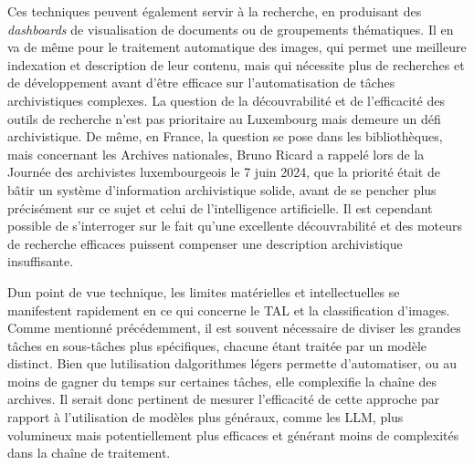 Ces
techniques peuvent également servir à la recherche, en produisant des
\emph{dashboards} de visualisation de documents ou de groupements
thématiques. Il en va de même pour le traitement automatique des images, qui
permet une meilleure indexation et description de leur contenu, mais qui
nécessite plus de recherches et de développement avant d'être efficace
sur l'automatisation de tâches archivistiques complexes. La question de
la découvrabilité et de l'efficacité des outils de recherche n'est pas
prioritaire au Luxembourg mais demeure un défi archivistique. De même, en
France, la question se pose dans les bibliothèques, mais concernant les
Archives nationales, Bruno Ricard a rappelé lors de la Journée des
archivistes luxembourgeois le 7 juin 2024, que la priorité était de bâtir
un système d'information archivistique solide, avant de se pencher plus
précisément sur ce sujet et celui de l'intelligence artificielle. Il est
cependant possible de s'interroger sur le fait qu'une excellente
découvrabilité et des moteurs de recherche efficaces puissent compenser
une description archivistique insuffisante.\newline

D\textquotesingle un point de vue technique, les limites matérielles et intellectuelles se manifestent rapidement en ce qui concerne le \gls{TAL} et la
classification d'images. Comme mentionné précédemment, il est souvent
nécessaire de diviser les grandes tâches en sous-tâches plus
spécifiques, chacune étant traitée par un modèle distinct. Bien que
l\textquotesingle utilisation d\textquotesingle algorithmes légers
permette d'automatiser, ou au moins de gagner du temps sur certaines
tâches, elle complexifie la \gls{chaîne} des archives. Il serait
donc pertinent de mesurer l'efficacité de cette approche par rapport à
l'utilisation de modèles plus généraux, comme les \gls{LLM}, plus volumineux mais potentiellement plus efficaces et
générant moins de complexités dans la chaîne de traitement.


